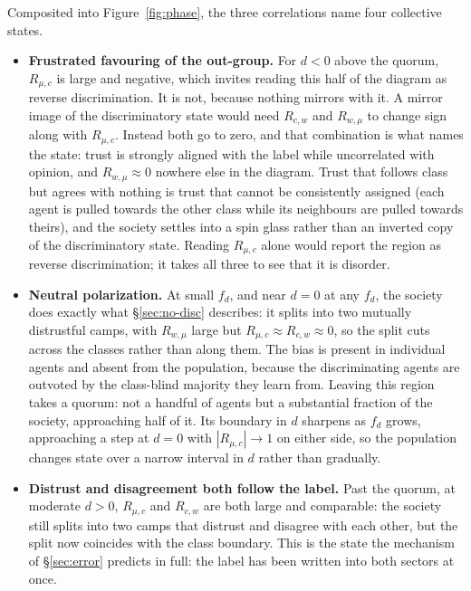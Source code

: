 \documentclass{article}
\newcommand{\Rwmu}{R_{w,\mu}}
\newcommand{\Rmuc}{R_{\mu,c}}
\newcommand{\Rcw}{R_{c,w}}
\newcommand{\fd}{f_{d}}
\begin{document}
Composited into Figure~\ref{fig:phase}, the three correlations name four collective
states.

\begin{itemize}
\item[(I)] \textbf{Frustrated favouring of the out-group.} For $d<0$ above the
  quorum, $\Rmuc$ is large and negative, which invites reading this half of the
  diagram as reverse discrimination. It is not, because nothing mirrors with it.
  A mirror image of the discriminatory state would need $\Rcw$ and $\Rwmu$ to change
  sign along with $\Rmuc$. Instead both go to zero, and that combination is what names
  the state: trust is strongly aligned with the label while uncorrelated with opinion,
  and $\Rwmu\approx0$ nowhere else in the diagram. Trust that follows class but agrees
  with nothing is trust that cannot be consistently assigned (each agent is
  pulled towards the other class while its neighbours are pulled towards theirs), and
  the society settles into a spin glass rather than an inverted copy of the discriminatory
  state. Reading $\Rmuc$ alone would report the region as reverse discrimination; it
  takes all three to see that it is disorder.

\item[(II)] \textbf{Neutral polarization.} At small $\fd$, and near $d=0$ at any
  $\fd$, the society does exactly what \S\ref{sec:no-disc} describes: it splits into
  two mutually distrustful camps, with $\Rwmu$ large but
  $\Rmuc\approx\Rcw\approx0$, so the split cuts across the classes rather than along
  them. The bias is present in individual agents and absent from the population,
  because the discriminating agents are outvoted by the class-blind majority they
  learn from. Leaving this region takes a quorum: not a handful of agents but a
  substantial fraction of the society, approaching half of it. Its boundary in $d$
  sharpens as $\fd$ grows, approaching a step at $d=0$ with $|\Rmuc|\to1$ on either
  side, so the population changes state over a narrow interval in $d$ rather than
  gradually.

\item[(III)] \textbf{Distrust and disagreement both follow the label.} Past the
  quorum, at moderate $d>0$, $\Rmuc$ and $\Rcw$ are both large and comparable: the
  society still splits into two camps that distrust and disagree with each other, but
  the split now coincides with the class boundary. This is the state the mechanism of
  \S\ref{sec:error} predicts in full: the label has been written into both
  sectors at once.


\end{itemize}
\end{document}
